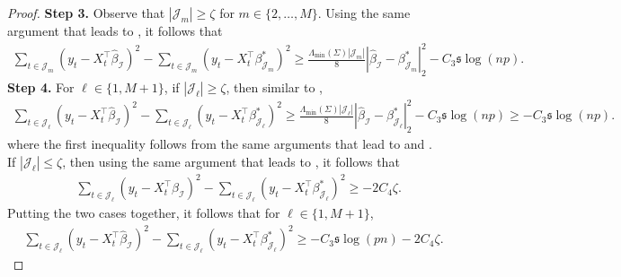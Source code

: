 \documentclass[11pt]{article}
\newcommand{\I}{{\mathcal I }}
\newcommand{\J}{{  \mathcal J } }
\newcommand{\s}{ { \mathfrak{s}  } }
\theoremstyle{plain}
\theoremstyle{definition}
\begin{document}
\begin{proof}
 
 {\bf Step 3.} Observe that  $|\J_m |\ge \zeta  $ for $m\in \{ 2,\ldots, M\}$.  Using the same argument that leads to , it follows that  
\begin{align} \label{eq:regression three change point step 3 last term}\sum_{t  \in \J_m   }(y_t  - X_t ^\top  \widehat \beta _\I ) ^2  - \sum_{t  \in \J_m   }(y_t  - X_t ^\top    \beta^*  _{\J_m }  ) ^2 
\ge \frac{\Lambda_{\min} (\Sigma) |\J_m   | }{8}  |\widehat \beta _\I  -  \beta^* _{\J_ m  }  |_2^2  -   C_3 \s  \log(np)   . 
\end{align} 
{\bf Step 4.} For  $\ell\in \{1,M+1\}$, if  $ |\J_\ell| \ge \zeta   $, then similar to , 
\begin{align*}  \sum_{t  \in \J_\ell    }(y_t  - X_t ^\top  \widehat \beta _\I ) ^2  - \sum_{t  \in \J_\ell    }(y_t  - X_t ^\top    \beta^*  _{\J_ \ell }  ) ^2 
\ge \frac{\Lambda_{\min} (\Sigma) |\J_\ell  | }{8}  |\widehat \beta _\I  -  \beta^* _{\J_ \ell  }  |_2^2  -   C_3 \s  \log(np)  
\ge   -   C_3 \s  \log(np)   . 
\end{align*} 
where the first inequality follows from the same arguments that lead to 
    and  .
   \\
    If  $ |\J_\ell| \le \zeta   $, then using the same argument that leads to , it follows that 
    \begin{align*} & \sum_{t  \in \J_\ell    }(y_t  - X_t ^\top  \widehat \beta _\I ) ^2  - \sum_{ t  \in \J_ \ell    }(y_t  - X_t ^\top    \beta^*  _{\J_ \ell }  ) ^2 \nonumber
\ge -2C_4 \zeta.
\end{align*} 
Putting the two cases together, it follows that for $\ell\in \{1,M+1\}$,
\begin{align}   \sum_{t  \in \J_\ell    }(y_t  - X_t ^\top  \widehat \beta _\I ) ^2  - \sum_{ t  \in \J_ \ell    }(y_t  - X_t ^\top    \beta^*  _{\J_ \ell }  ) ^2 
\ge -C_3\s\log(pn) -2C_4 \zeta. \label{eq:regression three change point step 3 last term 2}
\end{align}  


\end{proof}
\end{document}
